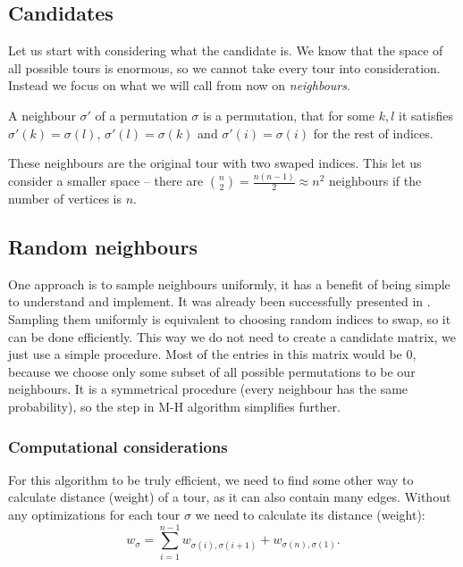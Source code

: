 \subsection{Candidates}
	Let us start with considering what the candidate is. We know that the space of all possible tours is enormous, so we cannot take every tour into consideration. Instead we focus on what we will call from now on \textit{neighbours}.
	\begin{definition}
		A neighbour $\sigma'$ of a permutation $\sigma$ is a permutation, that for some $k, l$ it satisfies $\sigma'(k) = \sigma(l)$, $\sigma'(l) = \sigma(k)$ and $\sigma'(i) = \sigma(i)$ for the rest of indices.
	\end{definition}
	These neighbours are the original tour with two swaped indices. This let  us consider a smaller space -- there are $\binom{n}{2} = \frac{n(n-1)}{2} \approx n^2$ neighbours if the number of vertices is $n$.

\subsection{Random neighbours}
	One approach is to sample neighbours uniformly, it has a benefit of being simple to understand and implement. It was already been successfully presented in \cite{decryption_tsp_MCMC}. Sampling them uniformly is equivalent to choosing random indices to swap, so it can be done efficiently. This way we do not need to create a candidate matrix, we just use a simple procedure. Most of the entries in this matrix would be $0$, because we choose only some subset of all possible permutations to be our neighbours. It is a symmetrical procedure (every neighbour has the same probability), so the step in M-H algorithm simplifies further.
	
	\subsubsection{Computational considerations}
		For this algorithm to be truly efficient, we need to find some other way to calculate distance (weight) of a tour, as it can also contain many edges. Without any optimizations for each tour $\sigma$ we need to calculate its distance (weight):
		\begin{equation*}
			w_\sigma = \sum_{i=1}^{n-1} w_{\sigma(i), \sigma(i+1)} + w_{\sigma(n), \sigma(1)}.
		\end{equation*}
		
